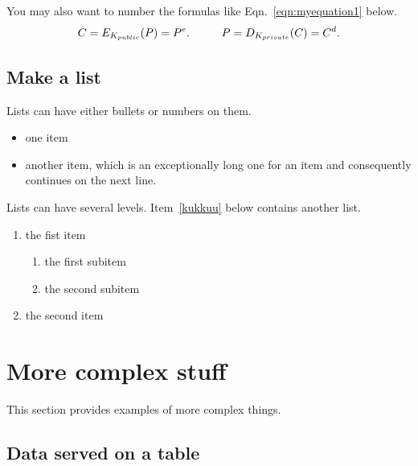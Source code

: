 \documentclass[a4paper,12pt]{article}
\begin{document}
You may also want to number the formulas like Eqn.~\ref{eqn:myequation1}
below.
\begin{equation}\label{eqn:myequation1}
C = E_{K_{public}}(P) = P^e. \hspace{10mm}   P = D_{K_{private}}(C) = C^d.
\end{equation}





\subsection{Make a list}\label{sec:list}

Lists can have either bullets or numbers on them. 

\begin{itemize}
\item one item
\item another item, which is an exceptionally long one for an item
  and consequently continues on the next line.
\end{itemize}

Lists can have several levels. Item~\ref{kukkuu} below contains
another list.
\begin{enumerate}
\item the fist item \label{kukkuu}
  \begin{enumerate}
  \item the first subitem 
  \item the second subitem
  \end{enumerate}
\item the second item
\end{enumerate}




\pagebreak[3]
\section{More complex stuff}

This section provides examples of more complex things.




\subsection{Data served on a table}
\end{document}
